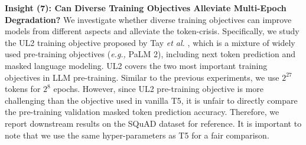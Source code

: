 \documentclass{article}
\newcommand{\eg}{\emph{e.g.,}\xspace}
\begin{document}



\textbf{Insight (7): Can Diverse Training Objectives Alleviate Multi-Epoch Degradation?} 
We investigate whether diverse training objectives can improve models from different aspects and alleviate the token-crisis. Specifically, we study the UL2 training objective proposed by Tay \textit{et al.} \cite{tay2022unifying}, which is a mixture of widely used pre-training objectives (\eg PaLM 2), including next token prediction and masked language modeling. UL2 covers the two most important training objectives in LLM pre-training. Similar to the previous experiments, we use $2^{27}$ tokens for $2^{8}$ epochs. However, since UL2 pre-training objective is more challenging than the objective used in vanilla T5, it is unfair to directly compare the pre-training validation masked token prediction accuracy. Therefore, we report downstream results on the SQuAD dataset for reference. It is important to note that we use the same hyper-parameters as T5 for a fair comparison.
\end{document}
